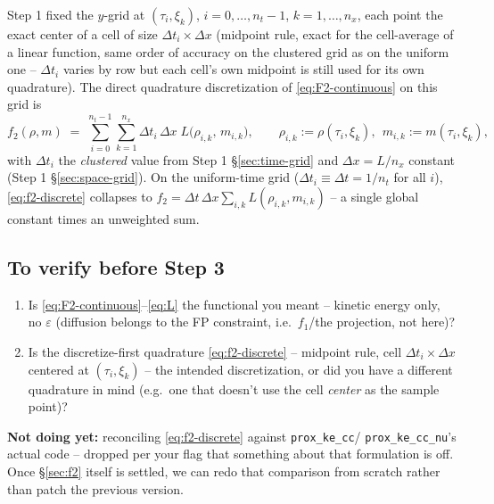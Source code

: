 \documentclass[11pt]{article}
\newcommand{\code}[1]{\texttt{#1}}
\begin{document}
Step 1 fixed the $y$-grid at $(\tau_i,\xi_k)$, $i=0,\ldots,n_t-1$, $k=1,\ldots,n_x$, each
point the exact center of a cell of size $\Delta t_i\times\Delta x$ (midpoint rule, exact
for the cell-average of a linear function, same order of accuracy on the clustered grid as
on the uniform one -- $\Delta t_i$ varies by row but each cell's own midpoint is still
used for its own quadrature). The direct quadrature discretization of
\eqref{eq:F2-continuous} on this grid is
\begin{equation}
  \label{eq:f2-discrete}
  f_2(\rho,m) \;=\; \sum_{i=0}^{n_t-1}\sum_{k=1}^{n_x} \Delta t_i\,\Delta x\;
  L\bigl(\rho_{i,k},\,m_{i,k}\bigr), \qquad \rho_{i,k}:=\rho(\tau_i,\xi_k),\ \ m_{i,k}:=m(\tau_i,\xi_k),
\end{equation}
with $\Delta t_i$ the \emph{clustered} value from Step 1 \S\ref{sec:time-grid} and
$\Delta x=L/n_x$ constant (Step 1 \S\ref{sec:space-grid}). On the uniform-time grid
($\Delta t_i\equiv\Delta t=1/n_t$ for all $i$), \eqref{eq:f2-discrete} collapses to
$f_2 = \Delta t\,\Delta x\sum_{i,k}L(\rho_{i,k},m_{i,k})$ -- a single global constant times
an unweighted sum.

\subsection*{To verify before Step 3}

\begin{enumerate}
  \item Is \eqref{eq:F2-continuous}--\eqref{eq:L} the functional you meant -- kinetic
        energy only, no $\varepsilon$ (diffusion belongs to the FP constraint, i.e.\
        $f_1$/the projection, not here)?
  \item Is the discretize-first quadrature \eqref{eq:f2-discrete} -- midpoint rule, cell
        $\Delta t_i\times\Delta x$ centered at $(\tau_i,\xi_k)$ -- the intended
        discretization, or did you have a different quadrature in mind (e.g.\ one that
        doesn't use the cell \emph{center} as the sample point)?
\end{enumerate}

\textbf{Not doing yet:} reconciling \eqref{eq:f2-discrete} against \code{prox\_ke\_cc}/
\code{prox\_ke\_cc\_nu}'s actual code -- dropped per your flag that something about that
formulation is off. Once \S\ref{sec:f2} itself is settled, we can redo that comparison
from scratch rather than patch the previous version.

\end{document}
